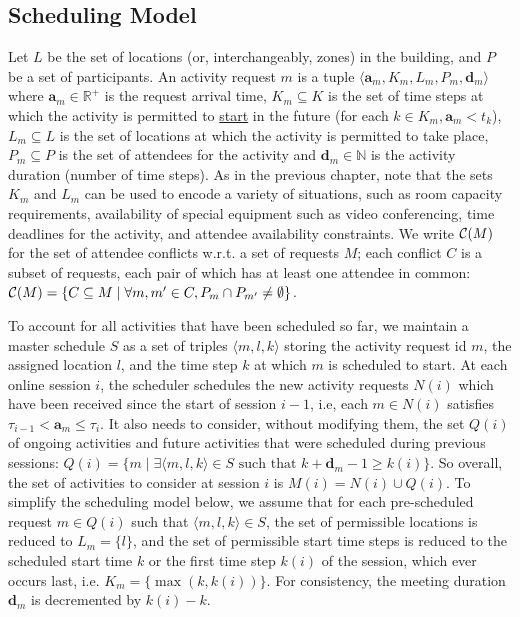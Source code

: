 \subsection{Scheduling Model}
Let $L$ be the set of locations (or, interchangeably, zones) in the building, and $P$ be a set of participants. An activity request $m$ is a tuple $\langle \bm{a}_m, K_m, L_m, P_m, \bm{d}_m \rangle$ where $\bm{a}_m \in \mathbb{R}^{+}$ is the request arrival time, $K_m\subseteq K$ is the set of time steps at which the activity is permitted to \underline{start} in the future (for each $k\in K_m, \bm{a}_m < t_k$), $L_m\subseteq L$ is the set of locations at which the activity is permitted to take place, $P_m\subseteq P$ is the set of attendees for the activity and $\bm{d}_m \in \mathbb{N}$ is the activity duration (number of time steps). As in the previous chapter, note that the sets $K_m$ and $L_m$ can be used to encode a variety of situations, such as room capacity requirements, availability of special equipment such as video conferencing, time deadlines for the activity, and attendee availability constraints. We write ${\cal C}(M)$ for the set of attendee conflicts w.r.t. a set of requests $M$; each conflict $C$ is a subset of requests, each pair of which has at least one attendee in common: ${\cal C}(M)=\{C\subseteq M \mid \forall m,m'\in C, P_m\cap P_{m'} \neq \emptyset \}$.

To account for all activities that have been scheduled so far, we maintain a master schedule $S$ as a set of triples $\langle m, l,k \rangle$ storing the activity request id $m$, the assigned location $l$, and the time step $k$ at which $m$ is scheduled to start. 
At each online session $i$, the scheduler schedules the new activity requests $N(i)$ which have been received since the start of session $i-1$, i.e, each $m\in N(i)$ satisfies $\tau_{i-1} < \bm{a}_m \leq \tau_{i}$. It also needs to consider, without modifying them, the set $Q(i)$ of ongoing activities and future activities that were scheduled during previous sessions: $Q(i) =\{m \mid \exists \langle m,l,k \rangle \in S\mbox{~such that~} k +\bm{d}_m -1 \geq k(i)\}$.
So overall, the set of activities to consider at session $i$ is $M(i) = N(i) \cup Q(i)$. To simplify the scheduling model below, we assume that for each pre-scheduled request $m \in Q(i)$ such that $\langle m,l,k \rangle \in S$, the set of permissible locations is reduced to $L_m =\{l\}$, and the set of permissible start time steps is reduced to the scheduled start time $k$ or the first time step $k(i)$ of the session, which ever occurs last, i.e. $K_m = \{\max(k,k(i))\}$. For consistency, the meeting duration $\bm{d}_m$ is decremented by $k(i)-k$.

